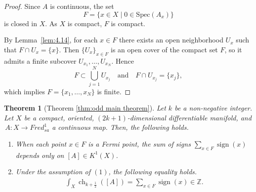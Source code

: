 \documentclass{amsart}
\newtheorem{thm}{Theorem}[section]
\theoremstyle{definition}
\theoremstyle{remark}
\begin{document}
\begin{proof}
Since $A$ is continuous, the set
\[
F=\{x\in X\mid 0\in \mathrm{Spec}(A_x)\}
\]
is closed in $X$. As $X$ is compact, $F$ is compact.

By Lemma~\ref{lem:4.14}, for each $x\in F$ there exists an open neighborhood $U_x$ such that
$F\cap U_x=\{x\}$. Then $\{U_x\}_{x\in F}$ is an open cover of the compact set $F$,
so it admits a finite subcover $U_{x_1},\dots,U_{x_N}$. Hence
\[
F \subset \bigcup_{j=1}^{N} U_{x_j}
\quad\text{and}\quad
F\cap U_{x_j}=\{x_j\},
\]
which implies $F=\{x_1,\dots,x_N\}$ is finite.
\end{proof}


\begin{thm}[Theorem \ref{thm:odd main theorem}]\label{thm:odd main thm}
Let $k$ be a non-negative integer. Let $X$ be a compact, oriented, $(2k+1)$-dimensional differentiable manifold, and \,$A\colon X\to Fred_{sa}^1$ a continuous map. Then, the following holds.
\begin{enumerate}
\item When each point $x \in F$ is a Fermi point, the sum of signs $\sum_{x \in F}\operatorname{sign}(x)$ depends only on $[A] \in K^1(X)$.
\item Under the assumption of $(1)$, the following equality holds.
\begin{align*}
\int_X \operatorname{ch}_{k+\frac{1}{2}}([A]) = \sum_{x \in F}\operatorname{sign}(x) \in \mathbb{Z}.
\end{align*} 
\end{enumerate} 
\end{thm}
\end{document}
